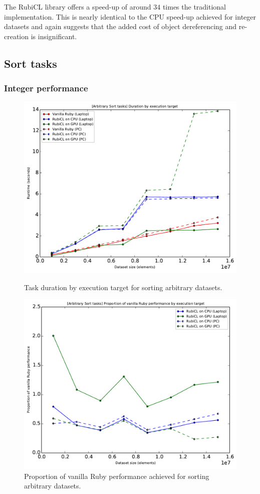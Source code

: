 The RubiCL library offers a speed-up of around $3$\textendash$4$ times the traditional implementation. This is nearly identical to the \ac{CPU} speed-up achieved for integer datasets and again suggests that the added cost of object dereferencing and re-creation is insignificant.



\subsection{Sort tasks}
\subsubsection{Integer performance}
\begin{figure}[H]
  \centering
  \includegraphics[width=\textwidth]{./graphing/sort_borked/runtimes.pdf}
  \caption{Task duration by execution target for sorting arbitrary datasets.}
  \label{fig:sortbork_task_runtime_g}

  \includegraphics[width=\textwidth]{./graphing/sort_borked/prop_van.pdf}
  \caption{Proportion of vanilla Ruby performance achieved for sorting arbitrary datasets.}
  \label{fig:sortbork_van_perf_g}

\end{figure}

